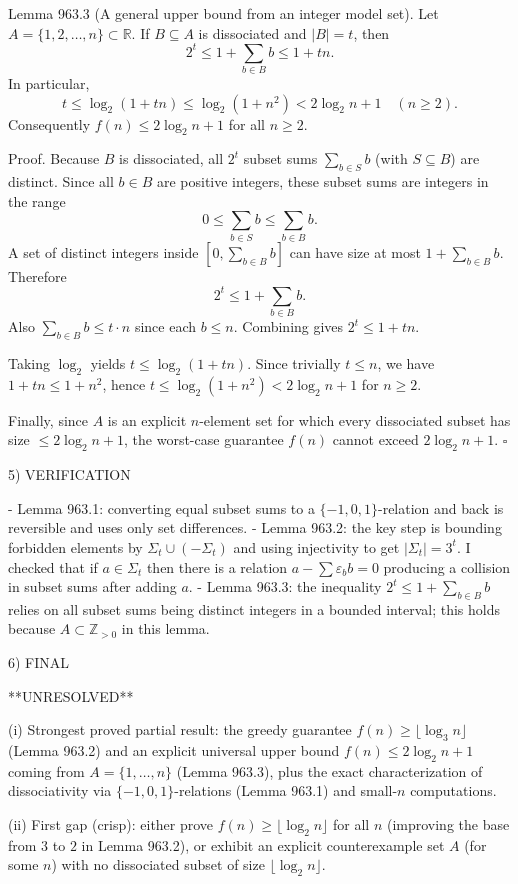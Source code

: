 Lemma 963.3 (A general upper bound from an integer model set).
Let $A=\{1,2,\dots,n\}\subset\mathbb R$. If $B\subseteq A$ is dissociated and $|B|=t$, then
\[
2^t \le 1+ \sum_{b\in B} b \le 1+ tn.
\]
In particular,
\[
 t\le \log_2(1+tn) \le \log_2(1+n^2) < 2\log_2 n + 1\quad (n\ge 2).
\]
Consequently $f(n)\le 2\log_2 n +1$ for all $n\ge 2$.

Proof.
Because $B$ is dissociated, all $2^t$ subset sums $\sum_{b\in S} b$ (with $S\subseteq B$) are distinct. Since all $b\in B$ are positive integers, these subset sums are integers in the range
\[
0 \le \sum_{b\in S}b \le \sum_{b\in B} b.
\]
A set of distinct integers inside $[0,\sum_{b\in B} b]$ can have size at most $1+\sum_{b\in B} b$. Therefore
\[
2^t \le 1+\sum_{b\in B} b.
\]
Also $\sum_{b\in B} b\le t\cdot n$ since each $b\le n$. Combining gives $2^t\le 1+tn$.

Taking $\log_2$ yields $t\le \log_2(1+tn)$. Since trivially $t\le n$, we have $1+tn\le 1+n^2$, hence $t\le \log_2(1+n^2)<2\log_2 n +1$ for $n\ge 2$.

Finally, since $A$ is an explicit $n$-element set for which every dissociated subset has size $\le 2\log_2 n+1$, the worst-case guarantee $f(n)$ cannot exceed $2\log_2 n+1$. $\square$

5) VERIFICATION

- Lemma 963.1: converting equal subset sums to a $\{-1,0,1\}$-relation and back is reversible and uses only set differences.
- Lemma 963.2: the key step is bounding forbidden elements by $\Sigma_t\cup(-\Sigma_t)$ and using injectivity to get $|\Sigma_t|=3^t$.
  I checked that if $a\in\Sigma_t$ then there is a relation $a-\sum \varepsilon_b b=0$ producing a collision in subset sums after adding $a$.
- Lemma 963.3: the inequality $2^t\le 1+\sum_{b\in B}b$ relies on all subset sums being distinct integers in a bounded interval; this holds because $A\subset\mathbb Z_{>0}$ in this lemma.

6) FINAL

**UNRESOLVED**

(i) Strongest proved partial result: the greedy guarantee $f(n)\ge \lfloor\log_3 n\rfloor$ (Lemma 963.2) and an explicit universal upper bound $f(n)\le 2\log_2 n+1$ coming from $A=\{1,\dots,n\}$ (Lemma 963.3), plus the exact characterization of dissociativity via $\{-1,0,1\}$-relations (Lemma 963.1) and small-$n$ computations.

(ii) First gap (crisp): either prove $f(n)\ge \lfloor\log_2 n\rfloor$ for all $n$ (improving the base from $3$ to $2$ in Lemma 963.2), or exhibit an explicit counterexample set $A$ (for some $n$) with no dissociated subset of size $\lfloor\log_2 n\rfloor$.

